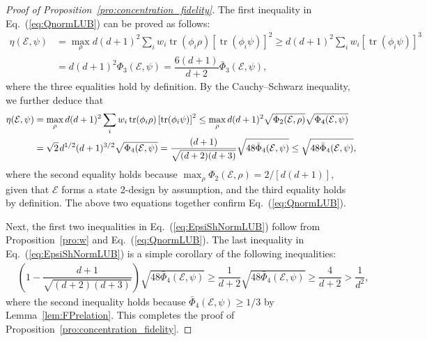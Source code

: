 \documentclass[aps,pra,twocolumn,nofootinbib,superscriptaddress,10pt]{revtex4-2}
\DeclareMathOperator{\tr}{tr}
\newcommand{\lsp}{\mkern 2mu}           %
\newcommand{\caE}{\mathcal{E}}
\newcommand{\bPhi}{\bar{\Phi}}
\newcommand{\eref}[1]{Eq.~\textup{(\ref{#1})}}
\newcommand{\lref}[1]{Lemma~\ref{#1}}
\newcommand{\pref}[1]{Proposition~\ref{#1}}
\begin{document}
\begin{proof}[Proof of \pref{pro:concentration_fidelity}]
The first inequality in \eref{eq:QnormLUB} can be proved as follows:
\begin{align}
    \eta(\caE,\psi)&=\max_{\rho}{d(d+1)^2}\sum_iw_i\tr(\phi_i\rho)\left[\tr(\phi_i \psi)\right]^2\ge {d(d+1)^2}\sum_iw_i\left[\tr(\phi_i \psi)\right]^3\nonumber\\
    &=d(d+1)^2\Phi_3(\caE,\psi)=\dfrac{6(d+1)}{d+2}\bPhi_3(\caE,\psi), \label{eq:w_lower}
\end{align}
where the three equalities hold by definition. By the Cauchy--Schwarz inequality, we further deduce that
\begin{align}
         \eta(\caE,\psi)&=\max_{\rho}{d(d+1)^2}\sum_iw_i\tr(\phi_i\rho)\left[\tr(\phi_i \psi)\right]^2 \le  \max_{\rho}d(d+1)^2\sqrt{\Phi_2(\caE,\rho)}\sqrt{\Phi_4(\caE,\psi)}\nonumber\\
    &=\sqrt{2}\lsp d^{1/2}(d+1)^{3/2}\sqrt{\Phi_4(\caE,\psi)}=\dfrac{(d+1)}{\sqrt{(d+2)(d+3)}}\sqrt{48\bPhi_4(\caE,\psi)}\le\sqrt{48\bPhi_4(\caE,\psi)},     \label{eq:w_upper}
    \end{align}
where the second equality holds because $\max_\rho \Phi_2(\caE,\rho)= 2/[d(d+1)]$, given that $\caE$ forms a state 2-design by assumption, and the third equality holds by definition. The above two equations together confirm \eref{eq:QnormLUB}.

Next, the first two inequalities in \eref{eq:EpsiShNormLUB} follow from \pref{pro:w} and \eref{eq:QnormLUB}. The last inequality in \eref{eq:EpsiShNormLUB} is a simple corollary of the following inequalities:
\begin{align}
   &\left(1- \dfrac{d+1}{\sqrt{(d+2)(d+3)}}\right)\sqrt{48\bPhi_4(\caE,\psi)}\ge \dfrac{1}{d+2}\sqrt{48\bPhi_4(\caE,\psi)}\ge\dfrac{4}{d+2}> \dfrac{1}{d^2},
\end{align}
where the second inequality holds because $\bPhi_4(\caE,\psi)\geq 1/3$ by \lref{lem:FPrelation}. This completes the proof of \pref{pro:concentration_fidelity}.
\end{proof}
\end{document}

